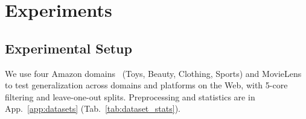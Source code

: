 

\section{Experiments}
\label{sec:exp}
\subsection{Experimental Setup}
\label{sec:exp_setup}
We use four Amazon domains~\cite{amazon} (Toys, Beauty, Clothing, Sports) and MovieLens~\cite{ml-1m} to test generalization across domains and platforms on the Web, with 5-core filtering and leave-one-out splits.
Preprocessing and statistics are in App.~\ref{app:datasets} (Tab.~\ref{tab:dataset_stats}).


